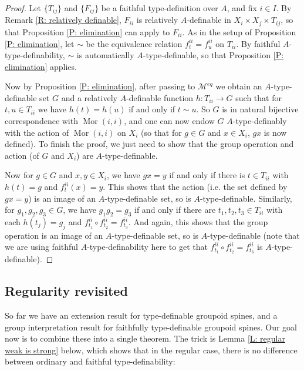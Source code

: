 \documentclass{amsart}
\theoremstyle{definition}
\begin{document}
\begin{proof}
    Let $\{T_{ij}\}$ and $\{F_{ij}\}$ be a faithful type-definition over $A$, and fix $i\in I$. By Remark \ref{R: relatively definable}, $F_{ii}$ is relatively $A$-definable in $X_i\times X_j\times T_{ij}$, so that Proposition \ref{P: elimination} can apply to $F_{ii}$. As in the setup of Proposition \ref{P: elimination}, let $\sim$ be the equivalence relation $f_t^{ii}=f_u^{ii}$ on $T_{ii}$. By faithful $A$-type-definability, $\sim$ is automatically $A$-type-definable, so that Proposition \ref{P: elimination} applies.
    
    Now by Proposition \ref{P: elimination}, after passing to $\mathcal M^{eq}$ we obtain an $A$-type-definable set $G$ and a relatively $A$-definable function $h:T_{ii}\rightarrow G$ such that for $t,u\in T_{ii}$ we have $h(t)=h(u)$ if and only if $t\sim u$. So $G$ is in natural bijective correspondence with $\operatorname{Mor}(i,i)$, and one can now endow $G$ $A$-type-definably with the action of $\operatorname{Mor}(i,i)$ on $X_i$ (so that for $g\in G$ and $x\in X_i$, $gx$ is now defined). To finish the proof, we just need to show that the group operation and action (of $G$ and $X_i$) are $A$-type-definable. 
    
    Now for $g\in G$ and $x,y\in X_i$, we have $gx=y$ if and only if there is $t\in T_{ii}$ with $h(t)=g$ and $f_t^{ii}(x)=y$. This shows that the action (i.e. the set defined by $gx=y$) is an image of an $A$-type-definable set, so is $A$-type-definable. Similarly, for $g_1,g_2,g_3\in G$, we have $g_1g_2=g_3$ if and only if there are $t_1,t_2,t_3\in T_{ii}$ with each $h(t_j)=g_j$ and $f_{t_1}^{ii}\circ f_{t_2}^{ii}=f_{t_3}^{ii}$. And again, this shows that the group operation is an image of an $A$-type-definable set, so is $A$-type-definable (note that we are using faithful $A$-type-definability here to get that $f_{t_1}^{ii}\circ f_{t_2}^{ii}=f_{t_3}^{ii}$ is $A$-type-definable).
\end{proof}

\subsection{Regularity revisited}

So far we have an extension result for type-definable groupoid spines, and a group interpretation result for faithfully type-definable groupoid spines. Our goal now is to combine these into a single theorem. The trick is Lemma \ref{L: regular weak is strong} below, which shows that in the regular case, there is no difference between ordinary and faithful type-definability:
\end{document}
